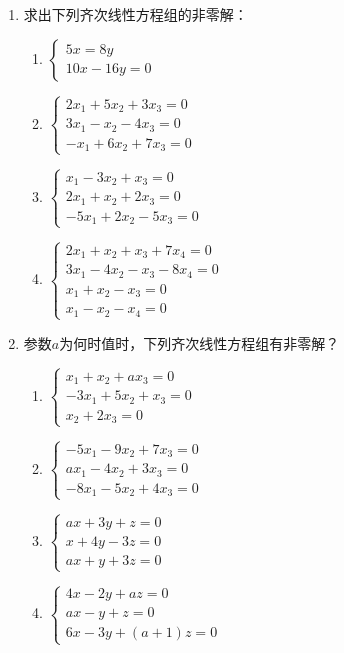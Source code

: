 \begin{enumerate}
\item 求出下列齐次线性方程组的非零解：
\begin{multicols}{2}
    \begin{enumerate}
\item $\begin{cases}
    5x=8y\\ 10x-16y=0
\end{cases}$
\item $\begin{cases}
    2x_1+5x_2+3x_3=0\\3x_1-x_2-4x_3=0\\-x_1+6x_2+7x_3=0
\end{cases}$
\item $\begin{cases}
    x_1-3x_2+x_3=0\\ 2x_1+x_2+2x_3=0\\ -5x_1+2x_2-5x_3=0
\end{cases}$
\item $\begin{cases}
    2x_1+x_2+x_3+7x_4=0\\ 3x_1-4x_2-x_3-8x_4=0\\
    x_1+x_2-x_3=0\\ x_1-x_2-x_4=0
\end{cases}$
    \end{enumerate}
\end{multicols}

\item 参数$a$为何时值时，下列齐次线性方程组有非零解？
\begin{multicols}{2}
    \begin{enumerate}
\item $\begin{cases}
   x_1+x_2+ax_3=0\\
-3x_1+5x_2+x_3=0\\
x_2+2x_3=0 
\end{cases}$
\item $\begin{cases}
  -5x_1-9x_2+7x_3=0\\
ax_1-4x_2+3x_3=0\\
-8x_1-5x_2+4x_3=0  
\end{cases}$
\item $\begin{cases}
    ax+3y+z=0\\ x+4y-3z=0\\ ax+y+3z=0
\end{cases}$
\item $\begin{cases}
    4x-2y+az=0 \\ax-y+z=0\\ 6x-3y+ (a+1) z=0   
\end{cases}$
    \end{enumerate}
\end{multicols}


\end{enumerate}

